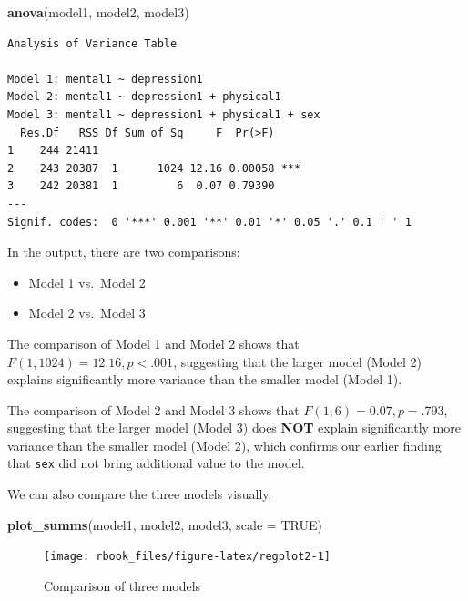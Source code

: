 \documentclass[]{book}
\newenvironment{Shaded}{\begin{snugshade}}{\end{snugshade}}
\newcommand{\DataTypeTok}[1]{\textcolor[rgb]{0.13,0.29,0.53}{#1}}
\newcommand{\KeywordTok}[1]{\textcolor[rgb]{0.13,0.29,0.53}{\textbf{#1}}}
\newcommand{\NormalTok}[1]{#1}
\newcommand{\OtherTok}[1]{\textcolor[rgb]{0.56,0.35,0.01}{#1}}
\providecommand{\tightlist}{%
  \setlength{\itemsep}{0pt}\setlength{\parskip}{0pt}}
\begin{document}
\begin{Shaded}
\begin{Highlighting}[]
\KeywordTok{anova}\NormalTok{(model1, model2, model3)}
\end{Highlighting}
\end{Shaded}

\begin{verbatim}
Analysis of Variance Table

Model 1: mental1 ~ depression1
Model 2: mental1 ~ depression1 + physical1
Model 3: mental1 ~ depression1 + physical1 + sex
  Res.Df   RSS Df Sum of Sq     F  Pr(>F)    
1    244 21411                               
2    243 20387  1      1024 12.16 0.00058 ***
3    242 20381  1         6  0.07 0.79390    
---
Signif. codes:  0 '***' 0.001 '**' 0.01 '*' 0.05 '.' 0.1 ' ' 1
\end{verbatim}

In the output, there are two comparisons:

\begin{itemize}
\tightlist
\item
  Model 1 vs.~Model 2
\item
  Model 2 vs.~Model 3
\end{itemize}

The comparison of Model 1 and Model 2 shows that \(F(1,1024)=12.16, p < .001\), suggesting that the larger model (Model 2) explains significantly more variance than the smaller model (Model 1).

The comparison of Model 2 and Model 3 shows that \(F(1,6)=0.07, p=.793\), suggesting that the larger model (Model 3) does \textbf{NOT} explain significantly more variance than the smaller model (Model 2), which confirms our earlier finding that \texttt{sex} did not bring additional value to the model.

We can also compare the three models visually.

\begin{Shaded}
\begin{Highlighting}[]
\KeywordTok{plot_summs}\NormalTok{(model1, model2, model3, }\DataTypeTok{scale =} \OtherTok{TRUE}\NormalTok{)}
\end{Highlighting}
\end{Shaded}

\begin{figure}

{\centering \texttt{[image: rbook\_files/figure-latex/regplot2-1]} 

}

\caption{Comparison of three models}\label{fig:regplot2}
\end{figure}
\end{document}
